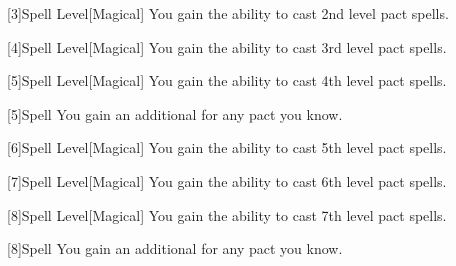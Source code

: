         [3]{Spell Level}[Magical] You gain the ability to cast 2nd level pact spells.

        [4]{Spell Level}[Magical] You gain the ability to cast 3rd level pact spells.

        [5]{Spell Level}[Magical] You gain the ability to cast 4th level pact spells.

        [5]{Spell} You gain an additional  for any pact  you know.

        [6]{Spell Level}[Magical] You gain the ability to cast 5th level pact spells.

        [7]{Spell Level}[Magical] You gain the ability to cast 6th level pact spells.

        [8]{Spell Level}[Magical] You gain the ability to cast 7th level pact spells.

        [8]{Spell} You gain an additional  for any pact  you know.






